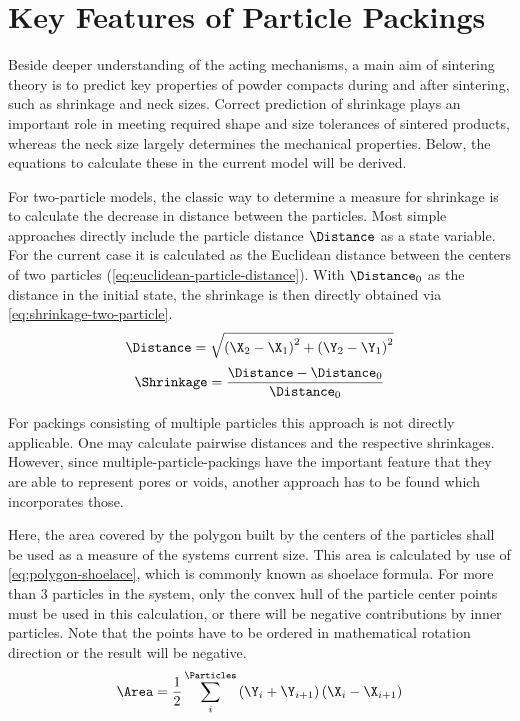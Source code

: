\section{Key Features of Particle Packings}\label{sec:packings}

Beside deeper understanding of the acting mechanisms, a main aim of sintering theory is to predict key properties of powder compacts during and after sintering, such as shrinkage and neck sizes.
Correct prediction of shrinkage plays an important role in meeting required shape and size tolerances of sintered products, whereas the neck size largely determines the mechanical properties.
Below, the equations to calculate these in the current model will be derived.

For two-particle models, the classic way to determine a measure for shrinkage is to calculate the decrease in distance between the particles.
Most simple approaches directly include the particle distance $\Distance$ as a state variable.
For the current case it is calculated as the Euclidean distance between the centers of two particles (\cref{eq:euclidean-particle-distance}).
With $\Distance_0$ as the distance in the initial state, the shrinkage is then directly obtained via \cref{eq:shrinkage-two-particle}.
\begin{equation}
    \Distance = \sqrt{\left( \X_2 - \X_1 \right)^2 + \left( \Y_2 - \Y_1 \right)^2}
    \label{eq:euclidean-particle-distance}
\end{equation}
\begin{equation}
    \Shrinkage = \frac{\Distance - \Distance_0}{\Distance_0}
    \label{eq:shrinkage-two-particle}
\end{equation}

For packings consisting of multiple particles this approach is not directly applicable.
One may calculate pairwise distances and the respective shrinkages.
However, since multiple-particle-packings have the important feature that they are able to represent pores or voids, another approach has to be found which incorporates those.

Here, the area covered by the polygon built by the centers of the particles shall be used as a measure of the systems current size.
This area is calculated by use of \cref{eq:polygon-shoelace}, which is commonly known as shoelace formula.
For more than 3 particles in the system, only the convex hull of the particle center points must be used in this calculation, or there will be negative contributions by inner particles.
Note that the points have to be ordered in mathematical rotation direction or the result will be negative.
\begin{equation}
    \Area = \frac12 \sum_i^{\Particles} \left( \Y_i + \Y_{i+1} \right) \left( \X_i - \X_{i+1} \right)
    \label{eq:polygon-shoelace}
\end{equation}

